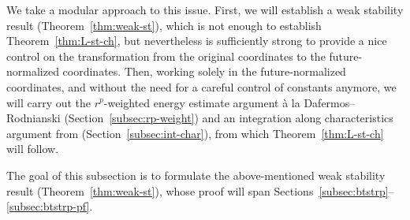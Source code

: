 \documentclass[10pt, reqno]{amsart}
\theoremstyle{definition}
\theoremstyle{remark}
\theoremstyle{conjecture}
\numberwithin{equation}{section}
\newcommand{\0}{\emptyset}
\begin{document}
We take a modular approach to this issue. First, we will establish a weak stability result (Theorem~\ref{thm:weak-st}), which is not enough to establish Theorem~\ref{thm:L-st-ch}, but nevertheless is sufficiently strong to provide a nice control on the transformation from the original coordinates to the future-normalized coordinates. Then, working solely in the future-normalized coordinates, and without the need for a careful control of constants anymore, we will carry out the $r^{p}$-weighted energy estimate argument \`a la Dafermos--Rodnianski (Section~\ref{subsec:rp-weight}) and an integration along characteristics argument from \cite{LO1} (Section~\ref{subsec:int-char}), from which Theorem~\ref{thm:L-st-ch} will follow.

The goal of this subsection is to formulate the above-mentioned weak stability result (Theorem~\ref{thm:weak-st}), whose proof will span Sections~\ref{subsec:btstrp}--\ref{subsec:btstrp-pf}. 
\end{document}

